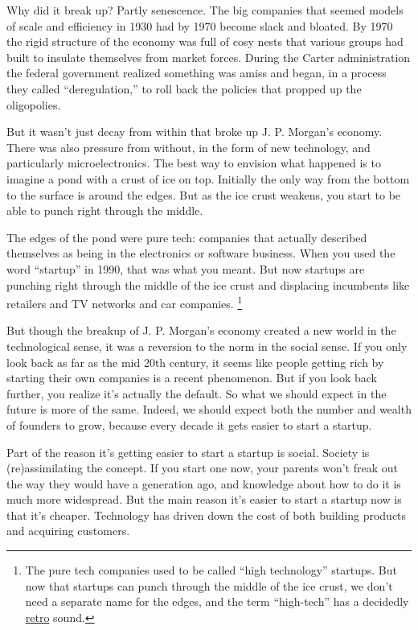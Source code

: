 Why did it break up? Partly senescence. The big companies that seemed
models of scale and efficiency in 1930 had by 1970 become slack and
bloated. By 1970 the rigid structure of the economy was full of cosy
nests that various groups had built to insulate themselves from market
forces. During the Carter administration the federal government realized
something was amiss and began, in a process they called
``deregulation,'' to roll back the policies that propped up the
oligopolies.

But it wasn't just decay from within that broke up J. P. Morgan's
economy. There was also pressure from without, in the form of new
technology, and particularly microelectronics. The best way to envision
what happened is to imagine a pond with a crust of ice on top. Initially
the only way from the bottom to the surface is around the edges. But as
the ice crust weakens, you start to be able to punch right through the
middle.

The edges of the pond were pure tech: companies that actually described
themselves as being in the electronics or software business. When you
used the word ``startup'' in 1990, that was what you meant. But now
startups are punching right through the middle of the ice crust and
displacing incumbents like retailers and TV networks and car companies.
\footnote{The pure tech companies used to be called ``high technology''
startups. But now that startups can punch through the middle of the ice
crust, we don't need a separate name for the edges, and the term
``high-tech'' has a decidedly
\href{https://books.google.com/ngrams/graph?content=high+tech&year_start=1900&year_end=2019&corpus=en-2019&smoothing=3}{retro}
sound.}

But though the breakup of J. P. Morgan's economy created a new world in
the technological sense, it was a reversion to the norm in the social
sense. If you only look back as far as the mid 20th century, it seems
like people getting rich by starting their own companies is a recent
phenomenon. But if you look back further, you realize it's actually the
default. So what we should expect in the future is more of the same.
Indeed, we should expect both the number and wealth of founders to grow,
because every decade it gets easier to start a startup.

Part of the reason it's getting easier to start a startup is social.
Society is (re)assimilating the concept. If you start one now, your
parents won't freak out the way they would have a generation ago, and
knowledge about how to do it is much more widespread. But the main
reason it's easier to start a startup now is that it's cheaper.
Technology has driven down the cost of both building products and
acquiring customers.

